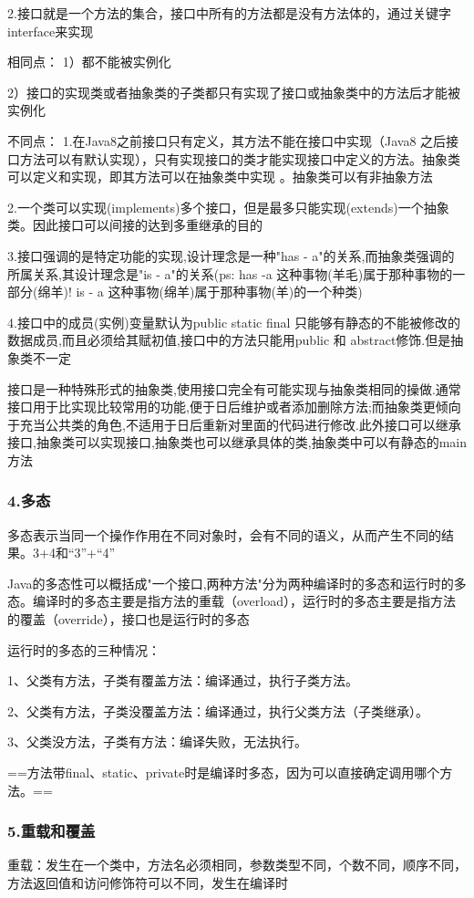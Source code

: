 \documentclass[UTF8]{ctexart}
\begin{document}
2.接口就是一个方法的集合，接口中所有的方法都是没有方法体的，通过关键字interface来实现

相同点：
1）都不能被实例化

2）接口的实现类或者抽象类的子类都只有实现了接口或抽象类中的方法后才能被实例化

不同点：
1.在Java8之前接口只有定义，其方法不能在接口中实现（Java8 之后接口方法可以有默认实现），只有实现接口的类才能实现接口中定义的方法。抽象类可以定义和实现，即其方法可以在抽象类中实现 。抽象类可以有非抽象方法

2.一个类可以实现(implements)多个接口，但是最多只能实现(extends)一个抽象类。因此接口可以间接的达到多重继承的目的

3.接口强调的是特定功能的实现,设计理念是一种"has - a"的关系,而抽象类强调的所属关系,其设计理念是"is - a"的关系(ps: has -a 这种事物(羊毛)属于那种事物的一部分(绵羊)! is - a 这种事物(绵羊)属于那种事物(羊)的一个种类)

4.接口中的成员(实例)变量默认为public static final 只能够有静态的不能被修改的数据成员,而且必须给其赋初值,接口中的方法只能用public 和 abstract修饰.但是抽象类不一定

接口是一种特殊形式的抽象类,使用接口完全有可能实现与抽象类相同的操做.通常接口用于比实现比较常用的功能,便于日后维护或者添加删除方法;而抽象类更倾向于充当公共类的角色,不适用于日后重新对里面的代码进行修改.此外接口可以继承接口,抽象类可以实现接口,抽象类也可以继承具体的类,抽象类中可以有静态的main方法

\subsubsection{4.多态}
多态表示当同一个操作作用在不同对象时，会有不同的语义，从而产生不同的结果。3+4和“3”+“4”

Java的多态性可以概括成"一个接口,两种方法"分为两种编译时的多态和运行时的多态。编译时的多态主要是指方法的重载（overload），运行时的多态主要是指方法的覆盖（override），接口也是运行时的多态

运行时的多态的三种情况：

1、父类有方法，子类有覆盖方法：编译通过，执行子类方法。

2、父类有方法，子类没覆盖方法：编译通过，执行父类方法（子类继承）。

3、父类没方法，子类有方法：编译失败，无法执行。

==方法带final、static、private时是编译时多态，因为可以直接确定调用哪个方法。==

\subsubsection{5.重载和覆盖}
重载：发生在一个类中，方法名必须相同，参数类型不同，个数不同，顺序不同，方法返回值和访问修饰符可以不同，发生在编译时
\end{document}
